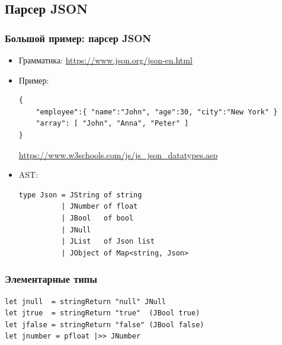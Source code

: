 \documentclass[xetex,mathserif,serif]{beamer}
\newcommand{\attribution}[1] {
    \begin{flushright}\begin{scriptsize}\textcolor{gray}{#1}\end{scriptsize}\end{flushright}
}
\begin{document}
    \subsection{Парсер JSON}

    \begin{frame}[fragile]
        \frametitle{Большой пример: парсер JSON}
        \begin{itemize}
            \item Грамматика: \url{https://www.json.org/json-en.html}
            \item Пример:
                \begin{verbatim}
{
    "employee":{ "name":"John", "age":30, "city":"New York" }
    "array": [ "John", "Anna", "Peter" ]
}
                \end{verbatim}
                \attribution{\url{https://www.w3schools.com/js/js_json_datatypes.asp}}
            \item AST:
                \begin{verbatim}
type Json = JString of string
          | JNumber of float
          | JBool   of bool
          | JNull
          | JList   of Json list
          | JObject of Map<string, Json>
                \end{verbatim}
        \end{itemize}
    \end{frame}

    \begin{frame}[fragile]
        \frametitle{Элементарные типы}
        \begin{verbatim}
let jnull  = stringReturn "null" JNull
let jtrue  = stringReturn "true"  (JBool true)
let jfalse = stringReturn "false" (JBool false)
let jnumber = pfloat |>> JNumber
        \end{verbatim}
    \end{frame}
\end{document}
